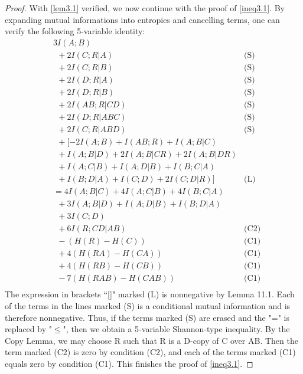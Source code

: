 \documentclass[10pt,journal]{IEEEtran}
\begin{document}
\begin{proof}
With \eqref{lem3.1} verified, we now continue with the proof of \eqref{ineq3.1}.
By expanding mutual informations into entropies and cancelling
terms, one can verify the following 5-variable identity:
\begin{align*}
&3I(A;B)&\\
      &\ \ + 2I(C;R|A)                                                         & \text{(S)} \\
      &\ \ + 2I(C;R|B)                                                         & \text{(S)} \\
      &\ \ + 2I(D;R|A)                                                         & \text{(S)} \\
      &\ \ + 2I(D;R|B)                                                         & \text{(S)} \\
      &\ \ + 2I(AB;R|CD)                                                       & \text{(S)} \\
      &\ \ + 2I(D;R|ABC)                                                       & \text{(S)} \\
      &\ \ + 2I(C;R|ABD)                                                       & \text{(S)} \\
      &\ \ + [-2I(A;B)+I(AB;R)+I(A;B|C)\\
      &\ \ +I(A;B|D)+2I(A;B|CR)+2I(A;B|DR)\\
      &\ \ +I(A;C|B)+I(A;D|B)+I(B;C|A)\\
      &\ \ +I(B;D|A)+I(C;D)+2I(C;D|R)]                  & \text{(L)} \\
    & = 4I(A;B|C)+4I(A;C|B)+4I(B;C|A)\\
      &\ \ +3I(A;B|D)+I(A;D|B)+I(B;D|A)\\
      &\ \ +3I(C;D)\\
      &\ \ + 6I(R;CD|AB)                                                       & \text{(C2)} \\
      &\ \ - (H(R)-H(C))                                                       & \text{(C1)} \\
      &\ \ + 4(H(RA)-H(CA))                                                   & \text{(C1)} \\
      &\ \ + 4(H(RB)-H(CB))                                                    & \text{(C1)} \\
      &\ \ - 7(H(RAB)-H(CAB))                                                 & \text{(C1)} \\
\end{align*}
The expression in brackets ``[]" marked (L) is nonnegative by Lemma 11.1.
Each of the terms in the lines marked (S) is a conditional mutual
information and is therefore nonnegative.  Thus, if the terms marked (S)
are erased and the "=" is replaced by "$\le$", then we obtain a 5-variable
Shannon-type inequality.  By the Copy Lemma, we may choose R such
that R is a D-copy of C over AB.  Then the term marked (C2) is zero
by condition (C2), and each of the terms marked (C1) equals zero
by condition (C1).    This finishes the proof of \eqref{ineq3.1}.


\end{proof}
\end{document}
